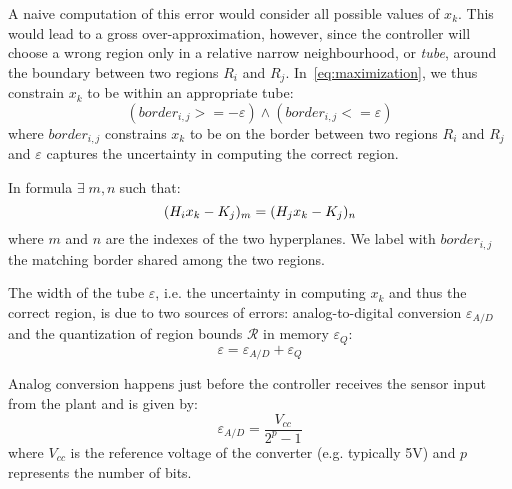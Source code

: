 
A naive computation of this error would consider all possible values of $x_k$.
This would lead to a gross over-approximation, however, since the controller
will choose a wrong region only in a relative narrow neighbourhood, or
\emph{tube}, around the boundary between two regions $R_i$ and $R_j$.
In~\autoref{eq:maximization}, we thus constrain $x_k$ to be within an appropriate tube:
\begin{equation}\label{eq:tube}
(border_{i,j} >= -\varepsilon) \land (border_{i,j} <= \varepsilon)
\end{equation}
where $border_{i,j}$ constrains $x_k$ to be on the border between two regions
$R_i$ and $R_j$ and $\varepsilon$ captures the uncertainty in computing the
correct region.

In formula $\exists\; m,n \;$such that:
\begin{equation}
(H_{i}x_{k}-K_{j})_{m} = (H_{j}x_{k}-K_{j})_{n}
\end{equation}
where $m$ and $n$ are the indexes of the two hyperplanes. We label with $border_{i,j}$ the matching border shared among the two regions.

The width of the tube $\varepsilon$, i.e. the uncertainty in computing $x_k$ and
thus the correct region, is due to two sources of errors: analog-to-digital
conversion $\varepsilon_{A/D}$ and the quantization of region bounds
$\mathcal{R}$ in memory $\varepsilon_{Q}$:
\begin{equation}\label{eq:epsilontot}
  \varepsilon=\varepsilon_{A/D}+\varepsilon_{Q}
\end{equation}

Analog conversion happens just before the controller receives the sensor input from the plant
and is given by:
\begin{equation*}
\varepsilon_{A/D}=\frac{V_{cc}}{2^{p}-1}
\end{equation*}
where $V_{cc}$ is the reference voltage of the converter (e.g. typically 5V) and
$p$ represents the number of bits.

